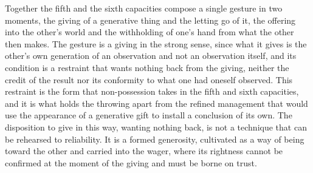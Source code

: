 Together the fifth and the sixth capacities compose a single gesture in two moments, the giving of a generative thing and the letting go of it, the offering into the other's world and the withholding of one's hand from what the other then makes. The gesture is a giving in the strong sense, since what it gives is the other's own generation of an observation and not an observation itself, and its condition is a restraint that wants nothing back from the giving, neither the credit of the result nor its conformity to what one had oneself observed. This restraint is the form that non-possession takes in the fifth and sixth capacities, and it is what holds the throwing apart from the refined management that would use the appearance of a generative gift to install a conclusion of its own. The disposition to give in this way, wanting nothing back, is not a technique that can be rehearsed to reliability. It is a formed generosity, cultivated as a way of being toward the other and carried into the wager, where its rightness cannot be confirmed at the moment of the giving and must be borne on trust.
